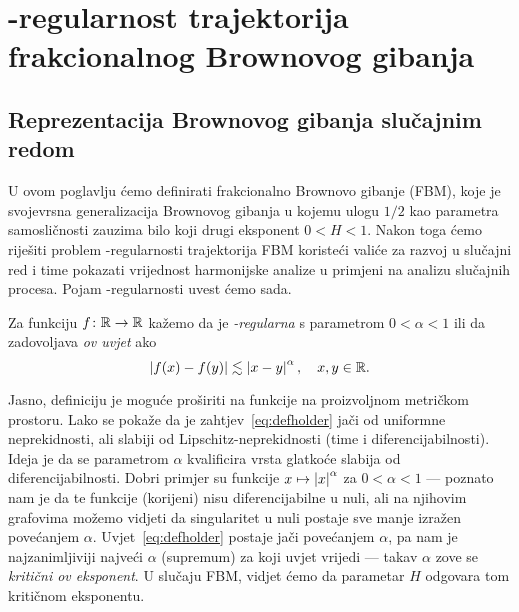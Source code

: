 \documentclass[main.tex]{subfiles}
\begin{document}
\nocite{*}

\chapter[\holder -regularnost trajektorija FBM]{\holder -regularnost trajektorija frakcionalnog Brownovog gibanja}\label{chapter-gl}
\section{Reprezentacija Brownovog gibanja slučajnim redom}\label{sec:gl-brown}
U ovom poglavlju ćemo definirati frakcionalno Brownovo gibanje (FBM), koje je svojevrsna generalizacija
Brownovog gibanja u kojemu ulogu \( 1/2 \) kao parametra samosličnosti zauzima bilo koji drugi
eksponent \( 0 < H < 1 \). Nakon toga ćemo riješiti problem \holder -regularnosti trajektorija FBM
koristeći valiće za razvoj u slučajni red i time pokazati vrijednost harmonijske analize
u primjeni na analizu slučajnih procesa. Pojam \holder -regularnosti uvest ćemo sada.

\begin{definicija}
	Za funkciju \( f \colon \mathbb{R} \to \mathbb{R} \) kažemo da je \emph{\holder -regularna} s parametrom
	\( 0 < \alpha < 1 \) ili da zadovoljava \emph{\holder ov uvjet} ako
	\begin{equation} \label{eq:defholder}
		\left| {f(x)-f(y)} \right| \lesssim \left| {x-y} \right|^\alpha, \quad x,y \in \mathbb{R}.
	\end{equation}
\end{definicija}

Jasno, definiciju je moguće proširiti na funkcije na proizvoljnom metričkom prostoru.
Lako se pokaže da je zahtjev~\eqref{eq:defholder} jači od uniformne neprekidnosti,
ali slabiji od Lipschitz-neprekidnosti (time i diferencijabilnosti). Ideja je da se parametrom
\( \alpha \) kvalificira vrsta glatkoće slabija od diferencijabilnosti. Dobri primjer su funkcije
\( x \mapsto \left| {x} \right| ^\alpha \) za \( 0 < \alpha < 1 \) --- poznato nam je da te funkcije (korijeni)
nisu diferencijabilne u nuli, ali na njihovim grafovima možemo vidjeti da singularitet u nuli
postaje sve manje izražen povećanjem \( \alpha \). Uvjet~\eqref{eq:defholder} postaje
jači povećanjem \( \alpha \), pa nam je najzanimljiviji najveći \( \alpha \) (supremum) za koji uvjet vrijedi --- takav
\( \alpha \) zove se \emph{kritični \holder ov eksponent}. U slučaju
FBM, vidjet ćemo da parametar \( H \) odgovara tom kritičnom eksponentu.
\end{document}
